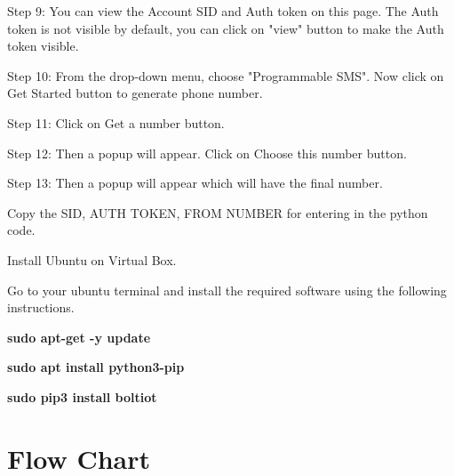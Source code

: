 \vspace{0.4cm}
Step 9: You can view the Account SID and Auth token on this page. The Auth token is not visible by   default, you can click on "view" button to make the Auth token visible.

\vspace{0.4cm}
Step 10: From the drop-down menu, choose "Programmable SMS". Now click on Get Started button to generate  phone number.

\vspace{0.4cm}
Step 11: Click on Get a number button.

\vspace{0.4cm}
Step 12: Then a popup will appear. Click on Choose this number button.

\vspace{0.4cm}
Step 13: Then a popup will appear which will have the final number.


\vspace{0.5cm}
Copy the SID, AUTH TOKEN, FROM NUMBER for entering in the python code.


\vspace{0.4cm}
Install Ubuntu on Virtual Box.

Go to your ubuntu terminal and install the required software using the following instructions.

\vspace{0.2cm}

\textbf{sudo apt-get -y update}

\textbf{sudo apt install python3-pip}

\textbf{sudo pip3 install boltiot}

\vspace{0.5cm}



\newpage

\section{Flow Chart}

